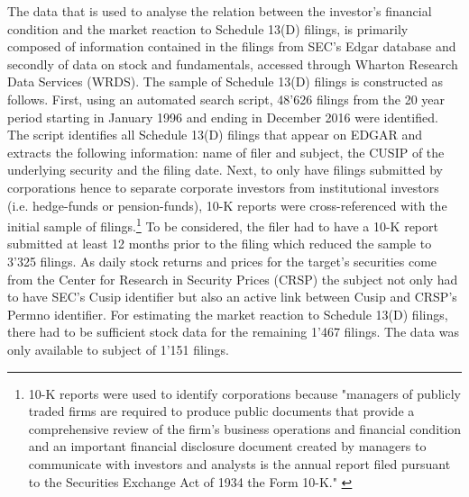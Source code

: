 \documentclass[12pt]{article}
\begin{document}
The data that is used to analyse the relation between the investor's financial condition and the market reaction to Schedule 13(D) filings,  is primarily composed of information contained in the filings from SEC's Edgar database and secondly of data on stock and fundamentals,  accessed through Wharton Research Data Services (WRDS). The sample of Schedule 13(D) filings is constructed as follows. First, using an automated search script, 48'626 filings from the 20 year period starting in January 1996 and ending in December 2016 were identified.  The script identifies all Schedule 13(D) filings that appear on EDGAR and extracts the following information: name of filer and subject, the CUSIP of the underlying security and the filing date. Next, to only have filings submitted by corporations hence to separate corporate investors from institutional investors (i.e. hedge-funds or pension-funds), 10-K reports were cross-referenced with the initial sample of filings.\footnote{10-K reports were used to identify corporations because "managers of publicly traded firms are required to produce public documents that provide a comprehensive review of the firm’s business operations and financial condition and an important financial disclosure document created by managers to communicate with investors and analysts is the annual report filed pursuant to the Securities Exchange Act of 1934 the Form 10-K." \citep[p. 1643]{Loughran2014}} To be considered, the filer had to have a 10-K report submitted at least 12 months prior to the filing which reduced the sample to 3'325 filings. As daily stock returns and prices for the target's securities come from the Center for Research in Security Prices (CRSP) the subject not only had to have SEC's Cusip identifier but also an active link between Cusip and CRSP's Permno identifier. For estimating the market reaction to Schedule 13(D) filings, there had to be sufficient stock data for the remaining 1'467 filings. The data was only available to subject of 1'151 filings. 
\end{document}
